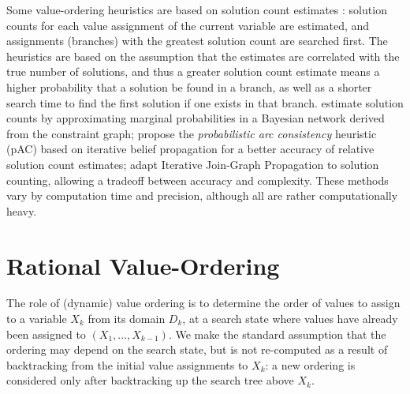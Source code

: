 Some value-ordering heuristics are based on solution count estimates
\cite{Dechter.cspheur,Meisels.solcount,HorschHavens.pac,Kask.solcount}:
solution counts for each value assignment of the current variable are
estimated, and assignments (branches) with the greatest solution count
are searched first.  The heuristics are based on the assumption that
the estimates are correlated with the true number of solutions, and
thus a greater solution count estimate means a higher probability that
a solution be found in a branch, as well as a shorter search time to
find the first solution if one exists in that
branch. \cite{Meisels.solcount} estimate solution counts by
approximating marginal probabilities in a Bayesian network derived
from the constraint graph; \cite{HorschHavens.pac} propose the
\emph{probabilistic arc consistency} heuristic (pAC) based on
iterative belief propagation for a better accuracy of relative
solution count estimates; \cite{Kask.solcount} adapt Iterative
Join-Graph Propagation to solution counting, allowing a tradeoff
between accuracy and complexity. These methods vary by computation
time and precision, although all are rather computationally heavy.

\section{Rational Value-Ordering}
\label{sec:csp-generic}

The role of (dynamic) value ordering is to determine the order of
values to assign to a variable $X_k$ from its domain $D_k$, at a
search state where values have already been assigned to $(X_1, ...,
X_{k-1})$. We make the standard assumption that the ordering may
depend on the search state, but is not re-computed as a result of
backtracking from the initial value assignments to $X_k$: a new
ordering is considered only after backtracking up the search tree
above $X_k$.

